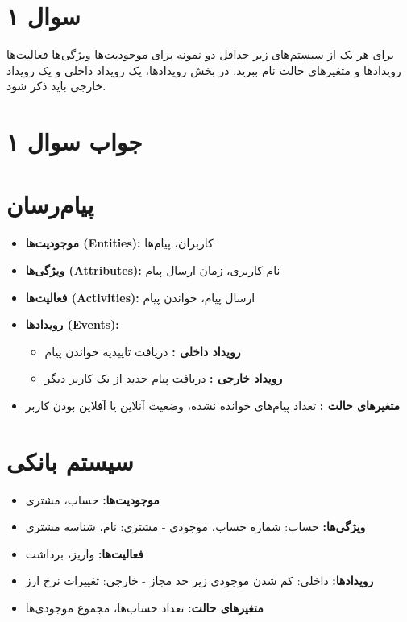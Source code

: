 \section*{سوال ۱}

برای هر یک از سیستم‌های زیر حداقل دو نمونه برای موجودیت‌ها 
ویژگی‌ها 
فعالیت‌ها 
رویدادها 
و متغیرهای حالت 
نام ببرید. در بخش رویدادها، یک رویداد داخلی 
و یک رویداد خارجی 
باید ذکر شود.

\section*{جواب سوال ۱}

\section*{پیام‌رسان}
\begin{itemize}
	\item \textbf{موجودیت‌ها (Entities):} کاربران، پیام‌ها
	\item \textbf{ویژگی‌ها (Attributes):} نام کاربری، زمان ارسال پیام
	\item \textbf{فعالیت‌ها (Activities):} ارسال پیام، خواندن پیام
	\item \textbf{رویدادها (Events):} 
	\begin{itemize}
		\item \textbf{رویداد داخلی :} دریافت تاییدیه خواندن پیام
		\item \textbf{رویداد خارجی :} دریافت پیام جدید از یک کاربر دیگر
	\end{itemize}
	\item \textbf{متغیرهای حالت :} تعداد پیام‌های خوانده نشده، وضعیت آنلاین یا آفلاین بودن کاربر
\end{itemize}

\section*{سیستم بانکی}
\begin{itemize}
	\item \textbf{موجودیت‌ها:} حساب، مشتری
	\item \textbf{ویژگی‌ها:} حساب: شماره حساب، موجودی - مشتری: نام، شناسه مشتری
	\item \textbf{فعالیت‌ها:} واریز، برداشت
	\item \textbf{رویدادها:} داخلی: کم شدن موجودی زیر حد مجاز - خارجی: تغییرات نرخ ارز
	\item \textbf{متغیرهای حالت:} تعداد حساب‌ها، مجموع موجودی‌ها
\end{itemize}


